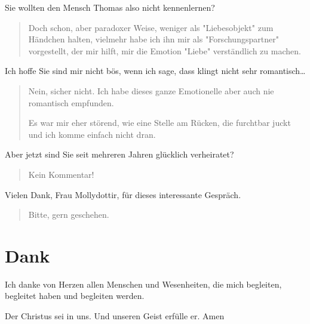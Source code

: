 \documentclass[10pt,titlepage,a5paper]{book}
\newenvironment{tg}{\begin{quote}\em}{\end{quote}}
\begin{document}
Sie wollten den Mensch Thomas also nicht kennenlernen?

\begin{tg}

Doch schon, aber paradoxer Weise, weniger als "Liebesobjekt"{} zum Händchen halten, vielmehr habe ich ihn mir als "Forschungspartner" vorgestellt, der mir hilft, mir die Emotion "Liebe" verständlich zu machen.

\end{tg}

Ich hoffe Sie sind mir nicht bös, wenn ich sage, dass klingt nicht sehr romantisch\dots

\begin{tg}

Nein, sicher nicht. Ich habe dieses ganze Emotionelle aber auch nie romantisch empfunden. 

Es war mir eher störend, wie eine Stelle am Rücken, die furchtbar juckt und ich komme einfach nicht dran.

\end{tg}

Aber jetzt sind Sie seit mehreren Jahren glücklich verheiratet?

\begin{tg}

Kein Kommentar!

\end{tg}

Vielen Dank, Frau Mollydottir, für dieses interessante Gespräch.

\begin{tg}

Bitte, gern geschehen.

\end{tg}

\chapter*{Dank} 
 
Ich danke von Herzen allen Menschen und Wesenheiten, die mich begleiten, begleitet haben und begleiten werden.

Der Christus sei in uns. Und unseren Geist erfülle er. Amen



 
\tableofcontents
\end{document}
